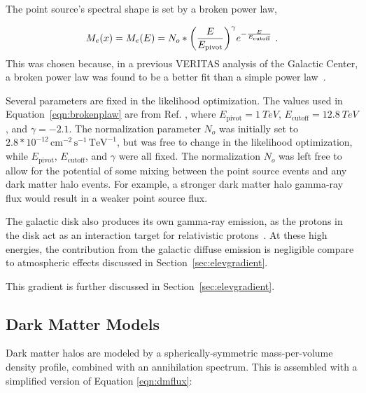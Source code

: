 The point source's spectral shape is set by a broken power law,

\begin{equation}\label{eqn:brokenplaw}
  M_e(x) = M_e(E) = N_o * { \left ( \frac{E}{E_{\textrm{pivot}}} \right ) }^{\gamma} {e}^{-\frac{E}{E_{\textrm{cutoff}}}} \,\,.
\end{equation}
This was chosen because, in a previous VERITAS analysis of the Galactic Center, a broken power law was found to be a better fit than a simple power law~\cite{VeritasGCRidge2015}.
  
Several parameters are fixed in the likelihood optimization.
The values used in Equation~\ref{eqn:brokenplaw} are from Ref. \cite{VeritasGCRidge2015}, where $E_{\textrm{pivot}}=\SI{1}{TeV}$, $E_{\textrm{cutoff}}=\SI{12.8}{TeV}$, and $\gamma=-2.1$.
The normalization parameter $N_o$ was initially set to $2.8*{10}^{-12}\,\text{cm}^{-2}\,\text{s}^{-1}\,\text{TeV}^{-1}$, but was free to change in the likelihood optimization, while $E_{\textrm{pivot}}$, $E_{\textrm{cutoff}}$, and $\gamma$ were all fixed.
The normalization $N_o$ was left free to allow for the potential of some mixing between the point source events and any dark matter halo events.
For example, a stronger dark matter halo gamma-ray flux would result in a weaker point source flux.

The galactic disk also produces its own gamma-ray emission, as the protons in the disk act as an interaction target for relativistic protons~\cite{tevgev_gc_diffuse}.
At these high energies, the contribution from the galactic diffuse emission is negligible compare to atmospheric effects discussed in Section~\ref{sec:elevgradient}.

This gradient is further discussed in Section~\ref{sec:elevgradient}.
  
\subsection{Dark Matter Models}\label{subsec:dmhalomodel}
Dark matter halos are modeled by a spherically-symmetric mass-per-volume density profile, combined with an annihilation spectrum.
This is assembled with a simplified version of Equation \ref{eqn:dmflux}:

